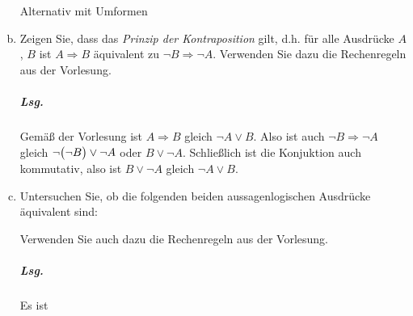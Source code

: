 \documentclass{scrreprt}
\begin{document}
\begin{enumerate}[(a)]
  Alternativ mit Umformen

\newpage
\item Zeigen Sie, dass das \emph{Prinzip der Kontraposition} gilt, d.h. für alle
  Ausdrücke $A$, $B$ ist $A \Rightarrow B$ äquivalent zu
  $\neg B \Rightarrow \neg A$.
  Verwenden Sie dazu die Rechenregeln aus der Vorlesung.

  \subparagraph{Lsg.}
  Gemäß der Vorlesung ist $A \Rightarrow B$ gleich $\neg A \lor B$.
  Also ist auch $\neg B \Rightarrow \neg A$ gleich
  $\neg \qty\big(\neg B) \lor \neg A$ oder $B \lor \neg A$.
  Schließlich ist die Konjuktion auch kommutativ, also ist
  $B \lor \neg A$ gleich $\neg A \lor B$.

\item Untersuchen Sie, ob die folgenden beiden aussagenlogischen Ausdrücke
  äquivalent sind:
  Verwenden Sie auch dazu die Rechenregeln aus der Vorlesung.

  \subparagraph{Lsg.} Es ist


\end{enumerate}
\end{document}
